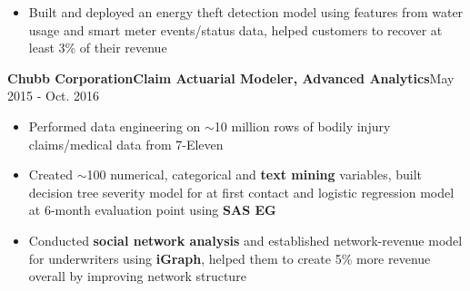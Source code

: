 \documentclass[10.5pt]{res} %
\begin{document}
\begin{resume}
\begin{itemize}
			\item Built and deployed an energy theft detection model using features from water usage and smart meter events/status data, helped customers to recover at least 3\% of their revenue  
		\end{itemize}\vspace{-\topsep}
	\textbf{Chubb Corporation}\quad \textbf{Claim Actuarial Modeler, Advanced Analytics}\hfill May 2015 - Oct. 2016
		\begin{itemize}  pt
			\item Performed data engineering on $\sim$10 million rows of bodily injury claims/medical data from 7-Eleven  
			\item Created $\sim$100 numerical, categorical and \textbf{text mining} variables, built {decision tree} severity model for at first contact and {logistic regression} model at 6-month evaluation point using \textbf{SAS EG} %
			\item  Conducted \textbf{social network analysis} and established network-revenue model for underwriters using \textbf{iGraph}, helped them to create 5\% more revenue overall by improving network structure 

\end{itemize}
\end{resume}
\end{document}
